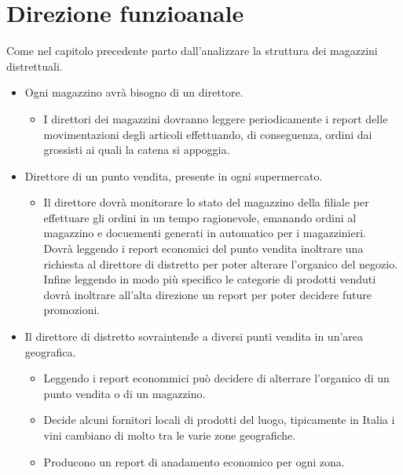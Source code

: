 \documentclass{report}
\begin{document}
   \chapter*{Direzione funzioanale}
   Come nel capitolo precedente parto dall'analizzare la struttura dei magazzini distrettuali.
   \begin{itemize}
        \item Ogni magazzino avrà bisogno di un direttore.
        \begin{itemize}
            \item I direttori dei magazzini dovranno leggere periodicamente i report delle movimentazioni degli articoli effettuando, di conseguenza, ordini dai grossisti ai quali la catena si appoggia.
        \end{itemize}

        \item Direttore di un punto vendita, presente in ogni supermercato.
        \begin{itemize}
            \item Il direttore dovrà monitorare lo stato del magazzino della filiale per effettuare gli ordini in un tempo ragionevole, emanando ordini al magazzino e docuementi generati in automatico per i magazzinieri.\\
            Dovrà leggendo i report economici del punto vendita inoltrare una richiesta al direttore di distretto per poter alterare l'organico del negozio.\\
            Infine leggendo in modo più specifico le categorie di prodotti venduti dovrà inoltrare all'alta direzione un report per poter decidere future promozioni.
        \end{itemize}

        \item Il direttore di distretto sovraintende a diversi punti vendita in un'area geografica.
        \begin{itemize}
            \item Leggendo i report econommici può decidere di alterrare l'organico di un punto vendita o di un magazzino.
            \item Decide alcuni fornitori locali di prodotti del luogo, tipicamente in Italia i vini cambiano di molto tra le varie zone geografiche.
            \item Producono un report di anadamento economico per ogni zona.
        \end{itemize}
   \end{itemize}
\end{document}
